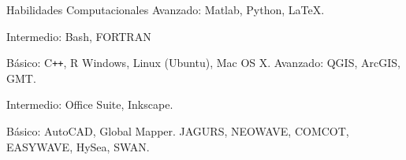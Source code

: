 
\begin{rubric}{Habilidades Computacionales}
	Avanzado: Matlab, Python, \LaTeX. \par
	Intermedio: Bash, FORTRAN \par
	Básico: C\texttt{++}, R
\entry*[Plataformas OS]
	Windows, Linux (Ubuntu), Mac OS X.
\entry*[Herramientas]
	Avanzado: QGIS, ArcGIS, GMT. \par
	Intermedio: Office Suite, Inkscape. \par
	Básico: AutoCAD, Global Mapper.
	JAGURS, NEOWAVE, COMCOT, EASYWAVE, HySea, SWAN.
\end{rubric}
